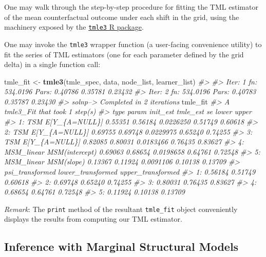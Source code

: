 \documentclass[12pt, krantz2,]{book}
\newenvironment{Shaded}{\begin{snugshade}}{\end{snugshade}}
\newcommand{\CommentTok}[1]{\textcolor[rgb]{0.56,0.35,0.01}{\textit{#1}}}
\newcommand{\KeywordTok}[1]{\textcolor[rgb]{0.13,0.29,0.53}{\textbf{#1}}}
\newcommand{\NormalTok}[1]{#1}
\newcommand{\StringTok}[1]{\textcolor[rgb]{0.31,0.60,0.02}{#1}}
\theoremstyle{definition}
\theoremstyle{definition}
\theoremstyle{definition}
\newcommand{\1}{\mathbbm{1}}
\begin{document}
One may walk through the step-by-step procedure for fitting the TML estimator
of the mean counterfactual outcome under each shift in the grid, using the
machinery exposed by the \href{https://tmle3.tlverse.org/}{\texttt{tmle3} R package}.

One may invoke the \texttt{tmle3} wrapper function (a user-facing convenience utility)
to fit the series of TML estimators (one for each parameter defined by the grid
delta) in a single function call:

\begin{Shaded}
\begin{Highlighting}[]
\NormalTok{tmle_fit <-}\StringTok{ }\KeywordTok{tmle3}\NormalTok{(tmle_spec, data, node_list, learner_list)}
\CommentTok{#> }
\CommentTok{#> Iter: 1 fn: 534.0196  Pars:  0.40786 0.35781 0.23432}
\CommentTok{#> Iter: 2 fn: 534.0196  Pars:  0.40783 0.35787 0.23430}
\CommentTok{#> solnp--> Completed in 2 iterations}
\NormalTok{tmle_fit}
\CommentTok{#> A tmle3_Fit that took 1 step(s)}
\CommentTok{#>          type          param init_est tmle_est        se   lower   upper}
\CommentTok{#> 1:        TSM  E[Y_\{A=NULL\}]  0.55351  0.56184 0.0226250 0.51749 0.60618}
\CommentTok{#> 2:        TSM  E[Y_\{A=NULL\}]  0.69755  0.69748 0.0229975 0.65240 0.74255}
\CommentTok{#> 3:        TSM  E[Y_\{A=NULL\}]  0.82085  0.80031 0.0183466 0.76435 0.83627}
\CommentTok{#> 4: MSM_linear MSM(intercept)  0.69063  0.68654 0.0198658 0.64761 0.72548}
\CommentTok{#> 5: MSM_linear     MSM(slope)  0.13367  0.11924 0.0091106 0.10138 0.13709}
\CommentTok{#>    psi_transformed lower_transformed upper_transformed}
\CommentTok{#> 1:         0.56184           0.51749           0.60618}
\CommentTok{#> 2:         0.69748           0.65240           0.74255}
\CommentTok{#> 3:         0.80031           0.76435           0.83627}
\CommentTok{#> 4:         0.68654           0.64761           0.72548}
\CommentTok{#> 5:         0.11924           0.10138           0.13709}
\end{Highlighting}
\end{Shaded}

\emph{Remark}: The \texttt{print} method of the resultant \texttt{tmle\_fit} object conveniently
displays the results from computing our TML estimator.

\hypertarget{inference-with-marginal-structural-models}{%
\subsection{Inference with Marginal Structural Models}\label{inference-with-marginal-structural-models}}
\end{document}

